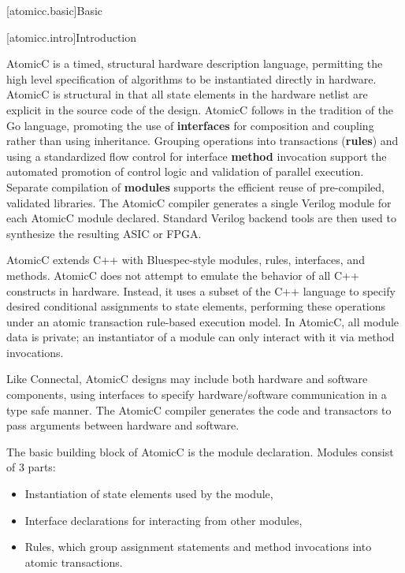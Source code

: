 [atomicc.basic]{Basic}

[atomicc.intro]{Introduction}

AtomicC is a timed, structural hardware description language, permitting
the high level specification of algorithms to be instantiated
directly in hardware.
AtomicC is structural in that all state elements in the hardware
netlist are explicit in the source code of the design.
AtomicC follows in the tradition of the Go language\cite{Pike2012},
promoting the use of \textbf{interfaces} for composition and
coupling rather than using inheritance.
Grouping operations into transactions (\textbf{rules}) and
using a standardized flow control for
interface \textbf{method} invocation
support the automated promotion of control logic and validation
of parallel execution.
Separate compilation of \textbf{modules}
supports the efficient reuse of pre-compiled, validated
libraries.
The AtomicC compiler 
generates a single Verilog module for each AtomicC module declared.
Standard Verilog backend tools are then used to synthesize
the resulting ASIC or FPGA.

AtomicC extends C++
with Bluespec-style\cite{Bluespec:www,Hoe:Thesis,HoeArvind:TRS_Synthesis2}
modules, rules, interfaces, and methods.
AtomicC does not attempt to emulate the behavior of all C++ constructs in hardware.
Instead, it uses a subset of the C++ language to specify desired
conditional assignments to state elements,
performing these operations under an atomic transaction rule-based execution model.
In AtomicC, all module data is private; an instantiator of a module can only 
interact with it via method invocations.

Like Connectal, AtomicC designs may include both hardware and
software components, using interfaces to specify hardware/software communication
in a type safe manner. The AtomicC compiler generates the code and transactors to pass
arguments between hardware and software.

The basic building block of AtomicC is the module declaration.
Modules consist of 3 parts:
\begin{itemize}
\item Instantiation of state elements used by the module,
\item Interface declarations for interacting from other modules,
\item Rules, which group assignment statements and method invocations into atomic transactions.
\end{itemize}


